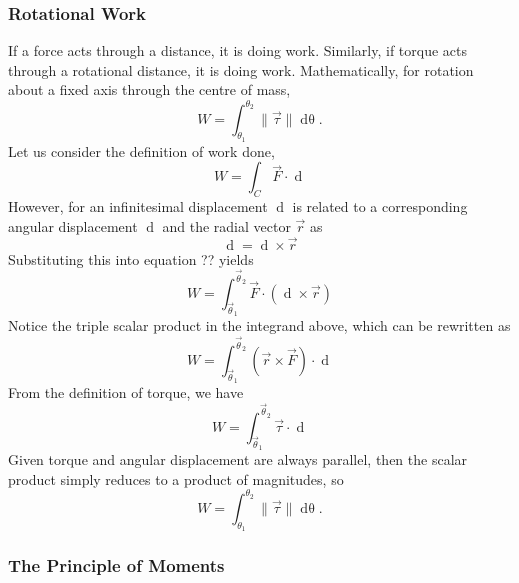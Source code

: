 \subsubsection*{Rotational Work}
If a force acts through a distance, it is doing work. Similarly, if torque acts through a rotational distance, it is doing work. Mathematically, for rotation about a fixed axis through the centre of mass,
\begin{equation}
    W = \int_{\theta_1}^{\theta_2} \| \vec{\tau} \| \mathop{\mathrm{d}\theta}.
\end{equation}
Let us consider the definition of work done,
\begin{equation}
    W = \int_C \vec{F} \cdot \mathop{\mathrm{d}\vec{s}}
\end{equation}
However, for an infinitesimal displacement $\mathop{\mathrm{d}\vec{s}}$ is related to a corresponding angular displacement $\mathop{\mathrm{d}\vec{\theta}}$ and the radial vector $\vec{r}$ as
\begin{equation}
    \mathop{\mathrm{d}\vec{s}} = \mathop{\mathrm{d}\vec{\theta}} \times \vec{r}
\end{equation}
Substituting this into equation ?? yields
\begin{equation}
    W = \int_{\vec{\theta}_1}^{\vec{\theta}_2} \vec{F} \cdot (\mathop{\mathrm{d}\vec{\theta}} \times \vec{r})
\end{equation}
Notice the triple scalar product in the integrand above, which can be rewritten as
\begin{equation}
    W = \int_{\vec{\theta}_1}^{\vec{\theta}_2} (\vec{r} \times \vec{F}) \cdot \mathop{\mathrm{d}\vec{\theta}}
\end{equation}
From the definition of torque, we have
\begin{equation}
    W = \int_{\vec{\theta}_1}^{\vec{\theta}_2} \vec{\tau} \cdot \mathop{\mathrm{d}\vec{\theta}}
\end{equation}
Given torque and angular displacement are always parallel, then the scalar product simply reduces to a product of magnitudes, so
\begin{equation}
    W = \int_{\theta_1}^{\theta_2} \| \vec{\tau} \| \mathop{\mathrm{d}\theta}.
\end{equation}

\subsubsection*{The Principle of Moments}

